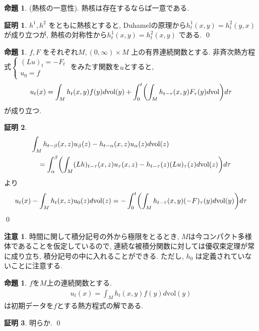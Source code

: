 \documentclass[10pt, fleqn, label-section=none]{bxjsarticle}
\theoremstyle{definition}
\newtheorem{prop}[dfn]{命題}
\newtheorem*{pf*}{証明}
\newtheorem{remark}[dfn]{注意}
\newcommand{\paren}[1]{\mleft( #1\mright )}
\newcommand{\vol}{\textrm{vol}}
\renewcommand{\-}{\hyphen}
\begin{document}
\begin{prop}(熱核の一意性).
熱核は存在するならば一意である. 
\end{prop}
\begin{pf*}
 $h^1, h^2$ をともに熱核とすると, Duhamelの原理から$h^1_t(x,y) = h^2_t (y,x)$ が成り立つが, 熱核の対称性から$h^1_t(x,y) = h^2_t (x,y)$ である. 
\qed
\end{pf*}


\begin{prop}
$f,F$ をそれぞれ$M, (0,\infty)\times M$ 上の有界連続関数とする. 非斉次熱方程式$\begin{cases} (Lu)_t = - F_t \\ u_0 = f \end{cases}$ をみたす関数を$u$とすると, 
\begin{align*} u_t (x) = \int_M h_t (x,y) f(y) d \vol(y) + \int_0^t \paren{\int_M h_{t - \tau}(x,y)F_\tau (y) d \vol } d \tau \end{align*}
が成り立つ. 
\end{prop}
\begin{pf*}
\begin{align*} &\int_M h_{t - \beta} (x,z) u_\beta (z) - h_{t -\alpha} (x,z) u_\alpha (z) d\vol(z) \\ &\quad = \int_\alpha^\beta \paren {\int_M (Lh)_{t - \tau} (x,z) u_\tau (x, z) - h_{t-\tau}(z)(Lu)_\tau (z) d \vol(z) } d \tau \end{align*}
より
\begin{align*} u_t (x) -  \int_M h_t(x,z)u_0 (z) d \vol(z) =  - \int_0^t \paren{\int_M h_{t-\tau}(x,y) (-F)_\tau (y) d \vol(y) } d \tau  \end{align*}
\qed
\end{pf*}

\begin{remark}
時間に関して積分記号の外から極限をとるとき, $M$は今コンパクト多様体であることを仮定しているので, 連続な被積分関数に対しては優収束定理が常に成り立ち, 積分記号の中に入れることができる. ただし, $h_0$ は定義されていないことに注意する.
\end{remark}

\begin{prop}$f$を$M$上の連続関数とする. 
\begin{align*} u_t (x) = \int_M h_t (x,y) f(y) d \vol(y) \end{align*}
は初期データを$f$とする熱方程式の解である.
\end{prop}
\begin{pf*}
明らか.
\qed
\end{pf*}
\end{document}
